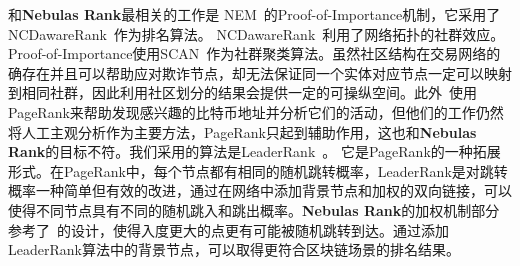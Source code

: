 和\textbf{Nebulas Rank}最相关的工作是 NEM~\cite{nem}的Proof-of-Importance机制，它采用了 NCDawareRank~\cite{Nikolakopoulos2013}作为排名算法。 NCDawareRank~\cite{Nikolakopoulos2013}利用了网络拓扑的社群效应。Proof-of-Importance使用SCAN~\cite{xu2007scan}\cite{shiokawa2015scan}\cite{chang2017mathsf}作为社群聚类算法。虽然社区结构在交易网络的确存在并且可以帮助应对欺诈节点，却无法保证同一个实体对应节点一定可以映射到相同社群，因此利用社区划分的结果会提供一定的可操纵空间。此外~\textcite{Fleder2015}使用PageRank来帮助发现感兴趣的比特币地址并分析它们的活动，但他们的工作仍然将人工主观分析作为主要方法，PageRank只起到辅助作用，这也和\textbf{Nebulas Rank}的目标不符。我们采用的算法是LeaderRank~\cite{Chen2013}\cite{Li2014}。 它是PageRank的一种拓展形式。在PageRank中，每个节点都有相同的随机跳转概率，LeaderRank是对跳转概率一种简单但有效的改进，通过在网络中添加背景节点和加权的双向链接，可以使得不同节点具有不同的随机跳入和跳出概率。\textbf{Nebulas Rank}的加权机制部分参考了~\textcite{Li2014}的设计，使得入度更大的点更有可能被随机跳转到达。通过添加LeaderRank算法中的背景节点，可以取得更符合区块链场景的排名结果。

